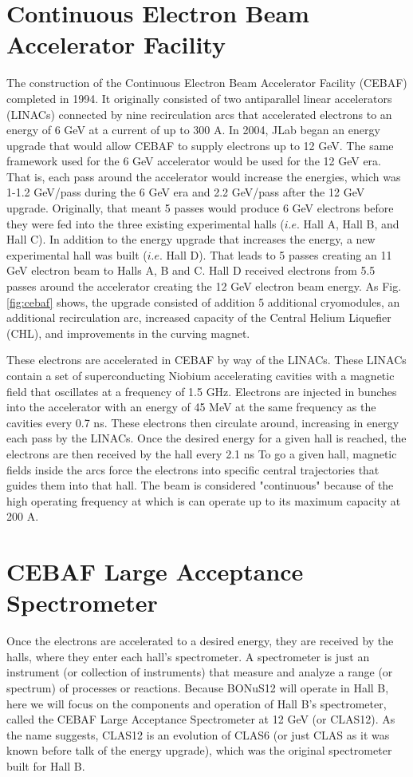\section{Continuous Electron Beam Accelerator Facility}
The construction of the Continuous Electron Beam Accelerator Facility (CEBAF) completed in 1994. It originally consisted of two antiparallel linear accelerators (LINACs) connected by nine recirculation arcs that accelerated electrons to an energy of 6 GeV at a current of up to 300 \textmu A. In 2004, JLab began an energy upgrade that would allow CEBAF to supply electrons up to 12 GeV. The same framework used for the 6 GeV accelerator would be used for the 12 GeV era. That is, each pass around the accelerator would increase the energies, which was 1-1.2 GeV/pass during the 6 GeV era \cite{clasnote:CEBAF} and 2.2 GeV/pass after the 12 GeV upgrade. Originally, that meant 5 passes would produce 6 GeV electrons before they were fed into the three existing experimental halls ($i.e.$ Hall A, Hall B, and Hall C). In addition to the energy upgrade that increases the energy, a new experimental hall was built ($i.e.$ Hall D). That leads to 5 passes creating an 11 GeV electron beam to Halls A, B and C. Hall D received electrons from 5.5 passes around the accelerator creating the 12 GeV electron beam energy. As Fig. \ref{fig:cebaf} shows, the upgrade consisted of addition 5 additional cryomodules, an additional recirculation arc, increased capacity of the Central Helium Liquefier (CHL), and improvements in the curving magnet.

These electrons are accelerated in CEBAF by way of the LINACs. These LINACs contain a set of superconducting Niobium accelerating cavities with a magnetic field that oscillates at a frequency of 1.5 GHz. Electrons are injected in bunches into the accelerator with an energy of 45 MeV at the same frequency as the cavities every 0.7 ns. These electrons then circulate around, increasing in energy each pass by the LINACs. Once the desired energy for a given hall is reached, the electrons are then received by the hall every 2.1 ns To go a given hall, magnetic fields inside the arcs force the electrons into specific central trajectories that guides them into that hall. The beam is considered "continuous" because of the high operating frequency at which is can operate up to its maximum capacity at 200 \textmu A.
 
\section{CEBAF Large Acceptance Spectrometer}
Once the electrons are accelerated to a desired energy, they are received by the halls, where they enter each hall's spectrometer. A spectrometer is just an instrument (or collection of instruments) that measure and analyze a range (or spectrum) of processes or reactions. Because BONuS12 will operate in Hall B, here we will focus on the components and operation of Hall B's spectrometer, called the CEBAF Large Acceptance Spectrometer at 12 GeV (or CLAS12). As the name suggests, CLAS12 is an evolution of CLAS6 (or just CLAS as it was known before talk of the energy upgrade), which was the original spectrometer built for Hall B. 

